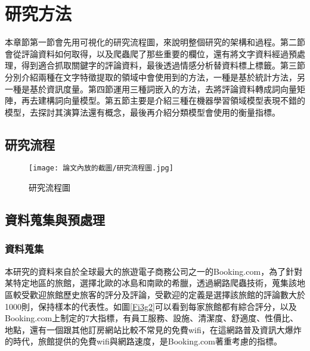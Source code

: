 %
%

\chapter{研究方法}
	
	本章節第一節會先用可視化的研究流程圖，來說明整個研究的架構和過程。第二節會從評論資料如何取得，以及爬蟲爬了那些重要的欄位，還有將文字資料經過預處理，得到適合抓取關鍵字的評論資料，最後透過情感分析替資料標上標籤。第三節分別介紹兩種在文字特徵提取的領域中會使用到的方法，一種是基於統計方法，另一種是基於資訊度量。第四節運用三種詞嵌入的方法，去將評論資料轉成詞向量矩陣，再去建構詞向量模型。第五節主要是介紹三種在機器學習領域模型表現不錯的模型，去探討其演算法還有概念，最後再介紹分類模型會使用的衡量指標。
	
\newpage
	
\section{研究流程}

	\begin{figure}[H]
	\centering
	\texttt{[image: 論文內放的截圖/研究流程圖.jpg]}
	\caption{研究流程圖}
	\label{Fi3g1}
	\end{figure}

\newpage

\section{資料蒐集與預處理}

\subsection{資料蒐集}

	本研究的資料來自於全球最大的旅遊電子商務公司之一的Booking.com，為了針對某特定地區的旅館，選擇北歐的冰島和南歐的希臘，透過網路爬蟲技術，蒐集該地區較受歡迎旅館歷史旅客的評分及評論，受歡迎的定義是選擇該旅館的評論數大於1000則，保持樣本的代表性。如圖\ref{Fi3g2}可以看到每家旅館都有綜合評分，以及Booking.com上制定的7大指標，有員工服務、設施、清潔度、舒適度、性價比、地點，還有一個跟其他訂房網站比較不常見的免費wifi，在這網路普及資訊大爆炸的時代，旅館提供的免費wifi與網路速度，是Booking.com著重考慮的指標。\\
	
